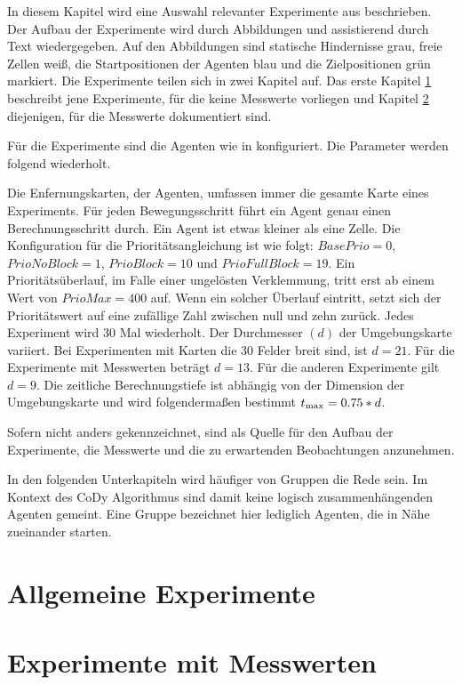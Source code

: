 In diesem Kapitel wird eine Auswahl relevanter Experimente aus \cite{book:regele} beschrieben. Der Aufbau der Experimente wird durch Abbildungen und assistierend durch Text wiedergegeben. Auf den Abbildungen sind statische Hindernisse grau, freie Zellen weiß, die Startpositionen der Agenten blau und die Zielpositionen grün markiert. Die Experimente teilen sich in zwei Kapitel auf. Das erste Kapitel \ref{chap:allgemein} beschreibt jene Experimente, für die keine Messwerte vorliegen und Kapitel \ref{chap:mitMesswerten} diejenigen, für die Messwerte dokumentiert sind.

Für die Experimente sind die Agenten wie in \cite{book:regele} konfiguriert. Die Parameter werden folgend wiederholt.

Die Enfernungskarten, der Agenten, umfassen immer die gesamte Karte eines Experiments. Für jeden Bewegungsschritt führt ein Agent genau einen Berechnungsschritt durch. Ein Agent ist etwas kleiner als eine Zelle. Die Konfiguration für die Prioritätsangleichung ist wie folgt:\newline
\(BasePrio=0\), \(PrioNoBlock=1\), \(PrioBlock=10\) und \(PrioFullBlock=19\). Ein Prioritätsüberlauf, im Falle einer ungelösten Verklemmung, tritt erst ab einem Wert von \(PrioMax=400\) auf. Wenn ein solcher Überlauf eintritt, setzt sich der Prioritätswert auf eine zufällige Zahl zwischen null und zehn zurück. Jedes Experiment wird 30 Mal wiederholt. 
Der Durchmesser \((d)\) der Umgebungskarte variiert. Bei Experimenten mit Karten die 30 Felder breit sind, ist \(d=21\). Für die Experimente mit Messwerten beträgt \(d=13\). Für die anderen Experimente gilt \(d=9\). Die zeitliche Berechnungstiefe ist abhängig von der Dimension der Umgebungskarte und wird folgendermaßen bestimmt \(t\textsubscript{max}=0.75*d\).

Sofern nicht anders gekennzeichnet, sind \cite{book:regele} als Quelle für den Aufbau der Experimente, die Messwerte und die zu erwartenden Beobachtungen anzunehmen.

In den folgenden Unterkapiteln wird häufiger von Gruppen die Rede sein. Im Kontext des CoDy Algorithmus sind damit keine logisch zusammenhängenden Agenten gemeint. Eine Gruppe bezeichnet hier lediglich Agenten, die in Nähe zueinander starten.

\section{Allgemeine Experimente}
\label{chap:allgemein}

\section{Experimente mit Messwerten}
\label{chap:mitMesswerten}
